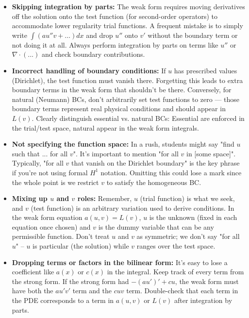 \documentclass[a4paper,11pt]{report}
\begin{document}
\begin{itemize}
    \item \textbf{Skipping integration by parts:} The weak form requires moving derivatives off the solution onto the test function (for second-order operators) to accommodate lower regularity trial functions. A frequent mistake is to simply write $\int (a u'' v + \dots)dx$ and drop $u''$ onto $v'$ without the boundary term or not doing it at all. Always perform integration by parts on terms like $u''$ or $\nabla \cdot (...)$ and check boundary contributions.

    \item \textbf{Incorrect handling of boundary conditions:} If $u$ has prescribed values (Dirichlet), the test function must vanish there. Forgetting this leads to extra boundary terms in the weak form that shouldn't be there. Conversely, for natural (Neumann) BCs, don't arbitrarily set test functions to zero — those boundary terms represent real physical conditions and should appear in $L(v)$. Clearly distinguish essential vs. natural BCs: Essential are enforced in the trial/test space, natural appear in the weak form integrals.

    \item \textbf{Not specifying the function space:} In a rush, students might say "find $u$ such that ... for all $v$". It's important to mention "for all $v$ in [some space]". Typically, "for all $v$ that vanish on the Dirichlet boundary" is the key phrase if you're not using formal $H^1$ notation. Omitting this could lose a mark since the whole point is we restrict $v$ to satisfy the homogeneous BC.

    \item \textbf{Mixing up $u$ and $v$ roles:} Remember, $u$ (trial function) is what we seek, and $v$ (test function) is an arbitrary variation used to derive conditions. In the weak form equation $a(u,v)=L(v)$, $u$ is the unknown (fixed in each equation once chosen) and $v$ is the dummy variable that can be any permissible function. Don't treat $u$ and $v$ as symmetric; we don't say "for all $u$" -- $u$ is particular (the solution) while $v$ ranges over the test space.

    \item \textbf{Dropping terms or factors in the bilinear form:} It's easy to lose a coefficient like $a(x)$ or $c(x)$ in the integral. Keep track of every term from the strong form. If the strong form had $- (a u')' + c u$, the weak form must have both the $a u' v'$ term and the $c u v$ term. Double-check that each term in the PDE corresponds to a term in $a(u,v)$ or $L(v)$ after integration by parts.


\end{itemize}
\end{document}

